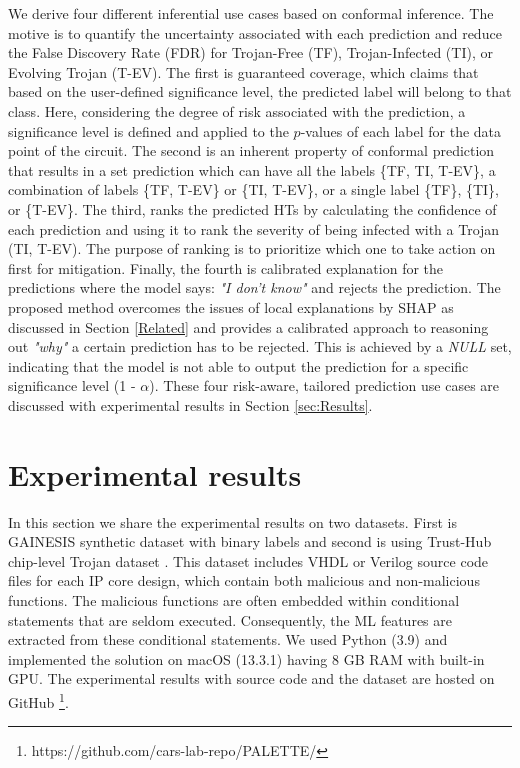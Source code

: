  We derive four different inferential use cases based on conformal inference. The motive is to quantify the uncertainty associated with each prediction and reduce the False Discovery Rate (FDR) for Trojan-Free (TF), Trojan-Infected (TI), or Evolving Trojan (T-EV). The first is guaranteed coverage, which claims that based on the user-defined significance level, the predicted label will belong to that class. Here, considering the degree of risk associated with the prediction, a significance level is defined and applied to the $p$-values of each label for the data point of the circuit. The second is an inherent property of conformal prediction that results in a set prediction which can have all the labels \{TF, TI, T-EV\}, a combination of labels \{TF, T-EV\} or \{TI, T-EV\}, or a single label \{TF\}, \{TI\}, or \{T-EV\}. The third, ranks the predicted HTs by calculating the confidence of each prediction and using it to rank the severity of being infected with a Trojan (TI, T-EV). The purpose of ranking is to prioritize which one to take action on first for mitigation. Finally, the fourth is calibrated explanation for the predictions where the model says: \textit{"I don't know"} and rejects the prediction. The proposed method overcomes the issues of local explanations by SHAP as discussed in Section \ref{Related} and provides a calibrated approach to reasoning out \textit{"why"} a certain prediction has to be rejected. This is achieved by a \textit{NULL} set, indicating that the model is not able to output the prediction for a specific significance level (1 - $\alpha$). These four risk-aware, tailored prediction use cases are discussed with experimental results in Section \ref{sec:Results}.



\section*{Experimental results}
\label{sec:Results}
In this section we share the experimental results on two datasets. First is GAINESIS \cite{liakos2022gainesis} synthetic dataset with binary labels and second is using Trust-Hub chip-level Trojan dataset \cite{px6s-sm21-22}. This dataset includes VHDL or Verilog source code files for each IP core design, which contain both malicious and non-malicious functions. The malicious functions are often embedded within conditional statements that are seldom executed. Consequently, the ML features are extracted from these conditional statements. We used Python (3.9) and implemented the solution on macOS (13.3.1) having 8 GB RAM with built-in GPU. The experimental results with source code and the dataset are hosted on GitHub \footnote{https://github.com/cars-lab-repo/PALETTE/}.


